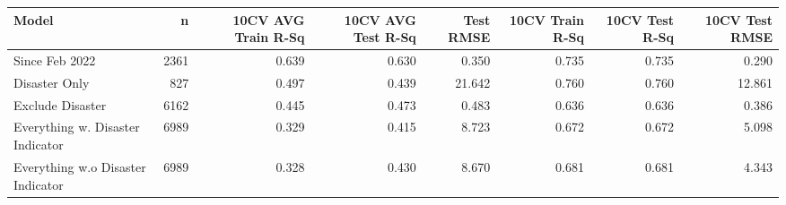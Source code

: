 
\begin{tabular}{l|r|r|r|r|r|r|r}
\hline
Model & n & 10CV AVG Train R-Sq & 10CV AVG Test R-Sq & Test RMSE & 10CV Train R-Sq & 10CV Test R-Sq & 10CV Test RMSE\\
\hline
Since Feb 2022 & 2361 & 0.639 & 0.630 & 0.350 & 0.735 & 0.735 & 0.290\\
\hline
Disaster Only & 827 & 0.497 & 0.439 & 21.642 & 0.760 & 0.760 & 12.861\\
\hline
Exclude Disaster & 6162 & 0.445 & 0.473 & 0.483 & 0.636 & 0.636 & 0.386\\
\hline
Everything w. Disaster Indicator & 6989 & 0.329 & 0.415 & 8.723 & 0.672 & 0.672 & 5.098\\
\hline
Everything w.o Disaster Indicator & 6989 & 0.328 & 0.430 & 8.670 & 0.681 & 0.681 & 4.343\\
\hline
\end{tabular}
